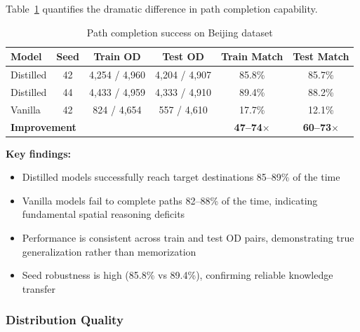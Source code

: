 Table~\ref{tab:od-results} quantifies the dramatic difference in path completion capability.

\begin{table}[h]
    \centering
    \caption{Path completion success on Beijing dataset}
    \label{tab:od-results}
    \small
    \begin{tabular}{lccccc}
        \toprule
        \textbf{Model}                           & \textbf{Seed}           & \textbf{Train OD}       & \textbf{Test OD} & \textbf{Train Match} & \textbf{Test Match} \\
        \midrule
        Distilled                                & 42                      & 4,254 / 4,960           & 4,204 / 4,907    & 85.8\%               & 85.7\%              \\
        Distilled                                & 44                      & 4,433 / 4,959           & 4,333 / 4,910    & 89.4\%               & 88.2\%              \\
        Vanilla                                  & 42                      & 824 / 4,654             & 557 / 4,610      & 17.7\%               & 12.1\%              \\
        \midrule
        \multicolumn{4}{l}{\textbf{Improvement}} & \textbf{47--74$\times$} & \textbf{60--73$\times$}                                                                 \\
        \bottomrule
    \end{tabular}
\end{table}

\textbf{Key findings:}
\begin{itemize}[noitemsep,topsep=0pt]
    \item Distilled models successfully reach target destinations 85--89\% of the time
    \item Vanilla models fail to complete paths 82--88\% of the time, indicating fundamental spatial reasoning deficits
    \item Performance is consistent across train and test OD pairs, demonstrating true generalization rather than memorization
    \item Seed robustness is high (85.8\% vs 89.4\%), confirming reliable knowledge transfer
\end{itemize}

\subsubsection{Distribution Quality}

